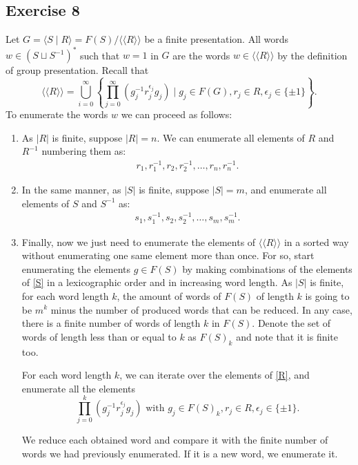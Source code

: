\documentclass[11pt,a4paper]{article}
\begin{document}
\subsection*{Exercise 8}
Let $ G = \langle S \mid R \rangle = F(S) / \langle \langle R \rangle \rangle $ be a finite presentation. All words $ w \in (S \sqcup S^{-1})^* $ such that $ w = 1 $ in $ G $ are the words $ w \in \langle \langle R \rangle \rangle $ by the definition of group presentation. Recall that
$$
  \langle \langle R \rangle \rangle = \bigcup_{i=0}^\infty \left\{ \prod_{j=0}^\infty (g_j^{-1} r_j^{\epsilon_j} g_j) \mid g_j \in F(G), r_j \in R, \epsilon_j \in \{ \pm 1 \} \right\}.
$$
To enumerate the words $ w $ we can proceed as follows:
\begin{enumerate}
  \item As $ |R| $ is finite, suppose $ |R| = n $. We can enumerate all elements of $ R $ and $ R^{-1} $ numbering them as:
  \begin{align} \label{R}
    r_1, r_1^{-1}, r_2, r_2^{-1}, \dots, r_n, r_n^{-1}.
  \end{align}
  
  \item In the same manner, as $ |S| $ is finite, suppose $ |S| = m $, and enumerate all elements of $ S $ and $ S^{-1} $ as:
  \begin{align} \label{S}
    s_1, s_1^{-1}, s_2, s_2^{-1}, \dots, s_m, s_m^{-1}.
  \end{align}

  \item Finally, now we just need to enumerate the elements of $ \langle \langle R \rangle \rangle $ in a sorted way without enumerating one same element more than once. For so, start enumerating the elements $ g \in F(S) $ by making combinations of the elements of \eqref{S} in a lexicographic order and in increasing word length. As $|S|$ is finite, for each word length $ k $, the amount of words of $ F(S) $ of length $ k $ is going to be $ m ^k $ minus the number of produced words that can be reduced. In any case, there is a finite number of words of length $ k $ in $ F(S) $. Denote the set of words of length less than or equal to $ k $ as  $ F(S)_k $ and note that it is finite too.
  
  For each word length $ k $, we can iterate over the elements of \eqref{R}, and enumerate all the elements
  $$
  \prod_{j=0}^k (g_j^{-1} r_j^{\epsilon_j} g_j) \text{ with } g_j \in F(S)_k, r_j \in R, \epsilon_j \in \{ \pm 1 \}.
  $$

  We reduce each obtained word and compare it with the finite number of words we had previously enumerated. If it is a new word, we enumerate it. 
\end{enumerate}
\end{document}
